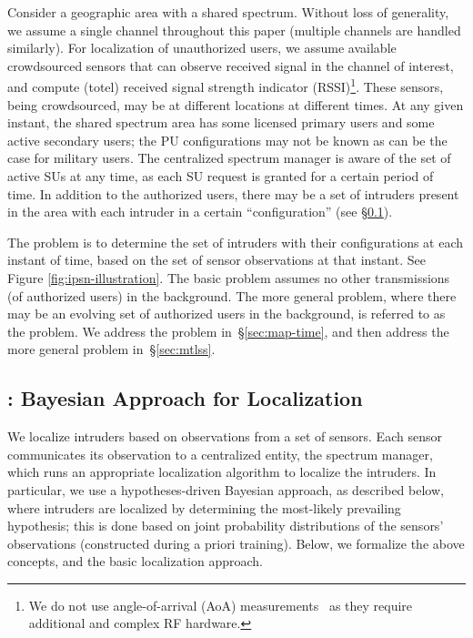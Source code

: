   Consider a geographic
area with a shared spectrum. Without loss of generality, we assume a
single channel throughout this paper (multiple channels are handled
similarly). For localization of unauthorized users, we assume
available crowdsourced sensors that can observe received signal in the
channel of interest, and compute (totel) received signal strength
indicator (RSSI)\footnote{We do not use angle-of-arrival (AoA)
    measurements~\cite{aoa-multi} as they require additional and
    complex RF hardware.}. These sensors, being crowdsourced, may be at
  different locations at different times.  At any given instant, the
  shared spectrum area has some licensed primary users and some active
  secondary users; the PU configurations may not be known as can be
  the case for military users. The centralized spectrum manager is
  aware of the set of active SUs at any time, as each SU request is
  granted for a certain period of time.
In addition to the authorized users, there may be a set of intruders
present in the area with each intruder in a certain ``configuration''
(see \S\ref{sec:map}).

The \mtl problem is to determine the set of intruders with their
configurations at each instant of time, based on the set of sensor
observations at that instant. See Figure \ref{fig:ipsn-illustration}. 
The basic \mtl problem assumes no other
transmissions (of authorized users) in the background.
The more general \mtl problem, where there may be an evolving set of
authorized users in the background, is referred to as the \mtlss
problem.  We address the \mtl problem in~\S\ref{sec:map-time}, and
then address the more general \mtlss problem in~\S\ref{sec:mtlss}.




\subsection{\map: Bayesian Approach for Localization}
\label{sec:map}

We localize intruders based on observations from a set of
sensors. Each sensor communicates its observation to a centralized
entity, the spectrum manager, which runs an appropriate
localization algorithm to localize the intruders.
In particular, we use a hypotheses-driven Bayesian approach, as
described below, where intruders are localized by determining the
most-likely prevailing hypothesis; this is done based on joint
probability distributions of the sensors' observations (constructed
during a priori training). Below, we formalize the above concepts, and
the basic localization approach.

